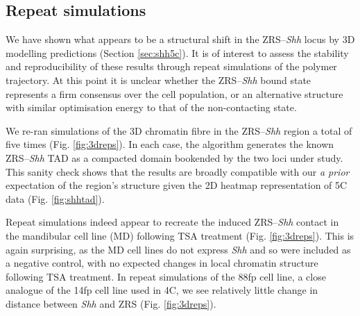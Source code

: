 \documentclass[a4paper,11pt,oneside]{book}
\begin{document}
\subsection{Repeat simulations}

We have shown what appears to be a structural shift in the ZRS--\emph{Shh} locus by 3D modelling predictions (Section \ref{sec:shh5c}). It is of interest to assess the stability and reproducibility of these results through repeat simulations of the polymer trajectory. At this point it is unclear whether the ZRS--\emph{Shh} bound state represents a firm consensus over the cell population, or an alternative structure with similar optimisation energy to that of the non-contacting state. 


We re-ran simulations of the 3D chromatin fibre in the ZRS--\emph{Shh} region a total of five times (Fig. \ref{fig:3dreps}). In each case, the algorithm generates the known ZRS--\emph{Shh} TAD as a compacted domain bookended by the two loci under study. This sanity check shows that the results are broadly compatible with our \emph{a prior} expectation of the region's structure given the 2D heatmap representation of 5C data (Fig. \ref{fig:shhtad}).

Repeat simulations indeed appear to recreate the induced ZRS--\emph{Shh} contact in the mandibular cell line (MD) following TSA treatment (Fig. \ref{fig:3dreps}). This is again surprising, as the MD cell lines do not express \emph{Shh} and so were included as a negative control, with no expected changes in local chromatin structure following TSA treatment. In repeat simulations of the 88fp cell line, a close analogue of the 14fp cell line used in 4C, we see relatively little change in distance between \emph{Shh} and ZRS (Fig. \ref{fig:3dreps}). 
\end{document}
